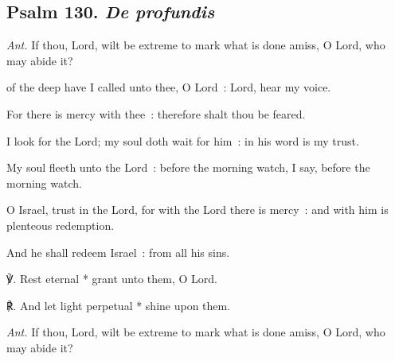 \vspace{-1ex}
\subsection{Psalm 130. \textit{De profundis}}\noindent
\textit{Ant.} If thou, Lord, wilt be extreme {\dag} to mark what is done amiss, O Lord, who may abide it?\par
{} of the deep have I called unto thee, O Lord~: Lord, hear my voice.\par
{}
For there is mercy with thee~: therefore shalt thou be feared.\par
{}I look for the Lord; my soul doth wait for him~: in his word is my trust.\par
{}My soul fleeth unto the Lord~: before the morning watch, I say, before the morning watch.\par
{}O Israel, trust in the Lord, for with the Lord there is mercy~: and with him is plenteous redemption.\par
{}And he shall redeem Israel~: from all his sins.\par
℣. Rest eternal * grant unto them, O Lord.\par
℟. And let light perpetual * shine upon them.\par\noindent
\textit{Ant.} If thou, Lord, wilt be extreme to mark what is done amiss, O Lord, who may abide it?
